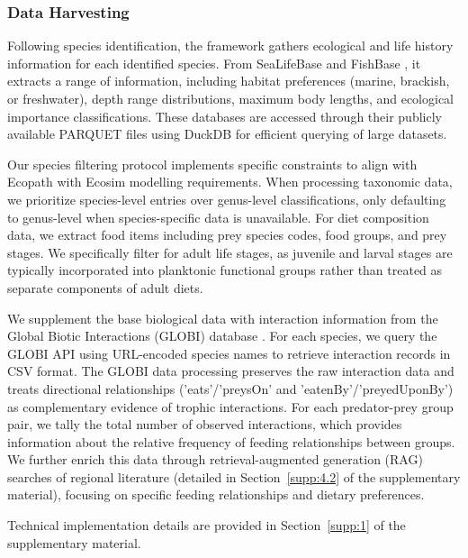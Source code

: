 \subsubsection{Data Harvesting}

Following species identification, the framework gathers ecological and life history information for each identified species. From SeaLifeBase and FishBase \citep{froese2010fishbase}, it extracts a range of information, including habitat preferences (marine, brackish, or freshwater), depth range distributions, maximum body lengths, and ecological importance classifications. These databases are accessed through their publicly available PARQUET files using DuckDB for efficient querying of large datasets. 

Our species filtering protocol implements specific constraints to align with Ecopath with Ecosim modelling requirements. When processing taxonomic data, we prioritize species-level entries over genus-level classifications, only defaulting to genus-level when species-specific data is unavailable. For diet composition data, we extract food items including prey species codes, food groups, and prey stages. We specifically filter for adult life stages, as juvenile and larval stages are typically incorporated into planktonic functional groups rather than treated as separate components of adult diets.

We supplement the base biological data with interaction information from the Global Biotic Interactions (GLOBI) database \citep{Poelen2014}. For each species, we query the GLOBI API using URL-encoded species names to retrieve interaction records in CSV format. The GLOBI data processing preserves the raw interaction data and treats directional relationships ('eats'/'preysOn' and 'eatenBy'/'preyedUponBy') as complementary evidence of trophic interactions. For each predator-prey group pair, we tally the total number of observed interactions, which provides information about the relative frequency of feeding relationships between groups. We further enrich this data through retrieval-augmented generation (RAG) searches of regional literature (detailed in Section~\ref{supp:4.2} of the supplementary material), focusing on specific feeding relationships and dietary preferences.

Technical implementation details are provided in Section~\ref{supp:1} of the supplementary material.
